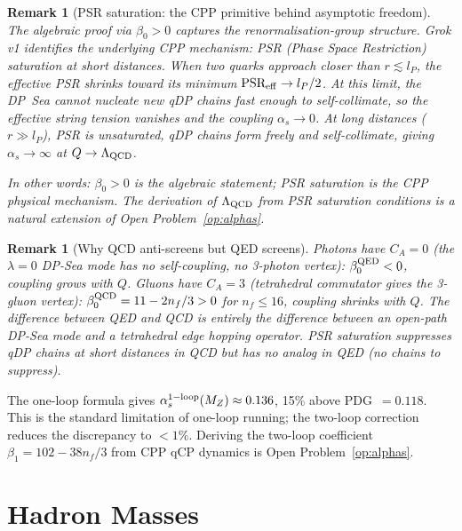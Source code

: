 \documentclass[11pt,a4paper]{article}
\newtheorem{remark}[theorem]{Remark}
\newcommand{\lP}{l_P}
\newcommand{\as}{\alpha_s}
\begin{document}
\begin{remark}[PSR saturation: the CPP primitive behind asymptotic freedom]
\label{rem:psr}
The algebraic proof via $\beta_0 > 0$ captures the
renormalisation-group structure.  Grok v1 identifies the underlying
CPP mechanism: \emph{PSR (Phase Space Restriction) saturation at
short distances}.  When two quarks approach closer than
$r \lesssim \lP$, the effective PSR shrinks toward its minimum
$\text{PSR}_{\rm eff} \to \lP/2$.  At this limit, the DP~Sea cannot
nucleate new qDP chains fast enough to self-collimate, so the
effective string tension vanishes and the coupling $\as \to 0$.
At long distances ($r \gg \lP$), PSR is unsaturated, qDP chains
form freely and self-collimate, giving $\as \to \infty$ at
$Q \to \Lambda_{\rm QCD}$.

In other words: $\beta_0 > 0$ is the algebraic statement;
PSR saturation is the CPP physical mechanism.  The derivation
of $\Lambda_{\rm QCD}$ from PSR saturation conditions is a
natural extension of Open Problem~\ref{op:alphas}.
\end{remark}

\begin{remark}[Why QCD anti-screens but QED screens]
Photons have $C_A = 0$ (the $\lambda=0$ DP-Sea mode has no
self-coupling, no 3-photon vertex): $\beta_0^{\rm QED} < 0$,
coupling grows with $Q$.  Gluons have $C_A = 3$ (tetrahedral
commutator gives the 3-gluon vertex): $\beta_0^{\rm QCD} = 11 -
2n_f/3 > 0$ for $n_f \leq 16$, coupling shrinks with $Q$.  The
difference between QED and QCD is entirely the difference between
an open-path DP-Sea mode and a tetrahedral edge hopping operator.
PSR saturation suppresses qDP chains at short distances in QCD
but has no analog in QED (no chains to suppress).
\end{remark}

The one-loop formula gives $\as^{\rm 1-loop}(M_Z) \approx 0.136$,
15\% above PDG~$= 0.118$.  This is the standard limitation of
one-loop running; the two-loop correction reduces the discrepancy
to $<1\%$.  Deriving the two-loop coefficient $\beta_1 = 102 -
38n_f/3$ from CPP qCP dynamics is Open Problem~\ref{op:alphas}.

\section{Hadron Masses}
\label{sec:hadrons}
\end{document}
